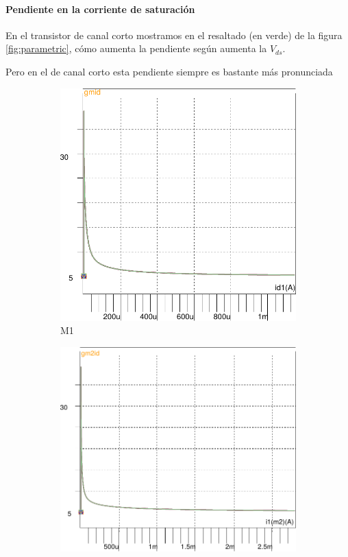 \paragraph{Pendiente en la corriente de saturación}
En el transistor de canal corto mostramos en el resaltado (en verde) de la figura \ref{fig:parametric}, cómo aumenta la pendiente según aumenta la $V_{ds}$.

Pero en el de canal corto esta pendiente siempre es bastante más pronunciada

\begin{figure}[!tbp]
   \begin{subfigure}[b]{0.3\textwidth}
       \includegraphics[width=\textwidth]{images/gmid_id_m1}
   \caption{M1}
   \label{fig:f1}
   \end{subfigure}
   \begin{subfigure}[b]{0.34\textwidth}
   \includegraphics[width=\textwidth]{images/gmid_id_m2}

\end{subfigure}
\end{figure}
